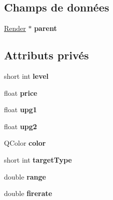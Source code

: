 \subsection*{Champs de données}
\begin{DoxyCompactItemize}
\item 
\hypertarget{classTower_af840ab6d1ec47afde8beca150ee5ef60}{
\hyperlink{classRender}{Render} $\ast$ {\bfseries parent}}
\label{classTower_af840ab6d1ec47afde8beca150ee5ef60}

\end{DoxyCompactItemize}
\subsection*{Attributs privés}
\begin{DoxyCompactItemize}
\item 
\hypertarget{classTower_a4a719d8065544dd9e0285424cae755bb}{
short int {\bfseries level}}
\label{classTower_a4a719d8065544dd9e0285424cae755bb}

\item 
\hypertarget{classTower_ab0899f8dc1ce4d15d9c27df3c3a9609d}{
float {\bfseries price}}
\label{classTower_ab0899f8dc1ce4d15d9c27df3c3a9609d}

\item 
\hypertarget{classTower_a141e6c72b5190821851e02a5ca412535}{
float {\bfseries upg1}}
\label{classTower_a141e6c72b5190821851e02a5ca412535}

\item 
\hypertarget{classTower_a53ab9046925a4c9b403fb41b0ca4a5d4}{
float {\bfseries upg2}}
\label{classTower_a53ab9046925a4c9b403fb41b0ca4a5d4}

\item 
\hypertarget{classTower_abd813990a1ae3b4300a54b38db0e1c51}{
QColor {\bfseries color}}
\label{classTower_abd813990a1ae3b4300a54b38db0e1c51}

\item 
\hypertarget{classTower_a7d2457327dd9be1bd9840f0654c3b76f}{
short int {\bfseries targetType}}
\label{classTower_a7d2457327dd9be1bd9840f0654c3b76f}

\item 
\hypertarget{classTower_a435abff8e426dcff8d0650f663417a71}{
double {\bfseries range}}
\label{classTower_a435abff8e426dcff8d0650f663417a71}

\item 
\hypertarget{classTower_a69f1f60ed131995bc50600bd5e53271e}{
double {\bfseries firerate}}
\label{classTower_a69f1f60ed131995bc50600bd5e53271e}


\end{DoxyCompactItemize}
